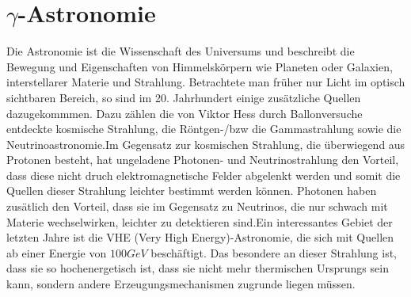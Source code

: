 \chapter{$\gamma$-Astronomie} 
Die Astronomie ist die Wissenschaft des Universums und beschreibt die Bewegung und Eigenschaften von Himmelskörpern wie Planeten oder Galaxien, interstellarer Materie und Strahlung. Betrachtete man früher nur Licht im optisch sichtbaren Bereich, so sind im 20. Jahrhundert einige zusätzliche Quellen dazugekommmen. Dazu zählen die von Viktor Hess durch Ballonversuche entdeckte kosmische Strahlung, die Röntgen-/bzw die Gammastrahlung sowie die Neutrinoastronomie.Im Gegensatz zur kosmischen Strahlung, die überwiegend aus Protonen besteht, hat ungeladene Photonen- und Neutrinostrahlung den Vorteil, dass diese nicht druch elektromagnetische Felder abgelenkt werden und somit die Quellen dieser Strahlung leichter bestimmt werden können. Photonen haben zusätlich den Vorteil, dass sie im Gegensatz zu Neutrinos, die nur schwach mit Materie wechselwirken, leichter zu detektieren sind.Ein interessantes Gebiet der letzten Jahre ist die VHE (Very High Energy)-Astronomie, die sich mit Quellen ab einer Energie von $100 \unit{GeV}$ \cite{DesignConcept} beschäftigt. Das besondere an dieser Strahlung ist, dass sie so hochenergetisch ist, dass sie nicht mehr thermischen Ursprungs sein kann, sondern andere Erzeugungsmechanismen zugrunde liegen müssen.

